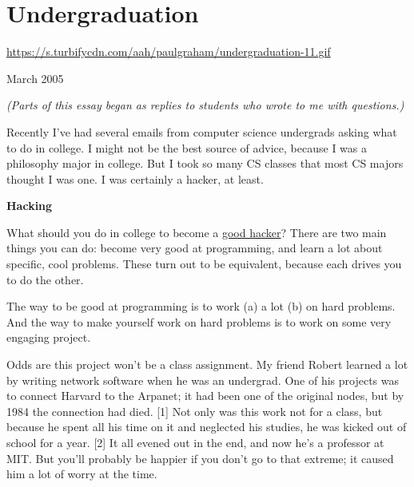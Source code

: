 \chapter{Undergraduation}


            
              
                \href{https://s.turbifycdn.com/aah/paulgraham/undergraduation-11.gif}{https://s.turbifycdn.com/aah/paulgraham/undergraduation-11.gif}




                  
                    
                    March 2005

\emph{(Parts of this essay began as replies to students who
                      wrote to me with questions.)}

Recently I've had several emails from computer
                    science undergrads asking what to do in college. I might not
                    be the best source of advice, because I was a philosophy
                    major in college. But I took so many CS classes that most CS
                    majors thought I was one. I was certainly a hacker, at
                    least.

\textbf{Hacking}

What should you
                    do in college to become a \href{http://www.paulgraham.com/gh.html}{good hacker}?
                    There are two main things you can do: become very good at
                    programming, and learn a lot about specific, cool problems.
                    These turn out to be equivalent, because each drives you to
                    do the other.

The way to be good at programming
                    is to work (a) a lot (b) on hard problems. And the way to
                    make yourself work on hard problems is to work on some very
                    engaging project.


                    Odds are this project won't be a class assignment. My friend
                    Robert learned a lot by writing network software when he was
                    an undergrad. One of his projects was to connect Harvard to
                    the Arpanet; it had been one of the original nodes, but by
                    1984 the connection had died. [1] Not only was this work not
                    for a class, but because he spent all his time on it and
                    neglected his studies, he was kicked out of school for a
                    year. [2] It all evened out in the end, and now he's a
                    professor at MIT. But you'll probably be happier if you
                    don't go to that extreme; it caused him a lot of worry at
                    the time.


